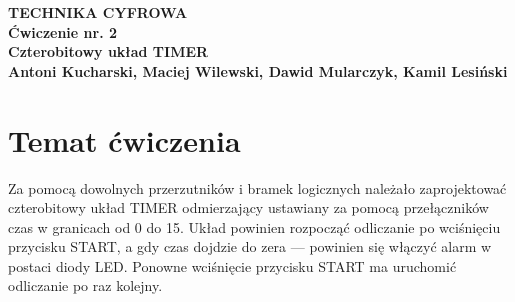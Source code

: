 \documentclass{article}
\begin{document}
    \begin{titlepage}
        \vspace*{\fill}
        \begin{center}
            \textbf{
                \Huge TECHNIKA CYFROWA \\ Ćwiczenie nr. 2\\ Czterobitowy układ TIMER\\ \bigskip
                \Large Antoni Kucharski, Maciej Wilewski, Dawid Mularczyk, Kamil Lesiński
                }
        \end{center}
        \vspace*{\fill}
    \end{titlepage}

    \tableofcontents
    \pagebreak

    \section{Temat ćwiczenia}
    Za pomocą dowolnych przerzutników i bramek logicznych należało zaprojektować czterobitowy układ TIMER odmierzający
    ustawiany za pomocą przełączników czas w granicach od 0 do 15. Układ powinien rozpocząć odliczanie po wciśnięciu przycisku
    START, a gdy czas dojdzie do zera --- powinien się włączyć alarm w postaci diody LED. Ponowne wciśnięcie przycisku
    START ma uruchomić odliczanie po raz kolejny.
\end{document}
